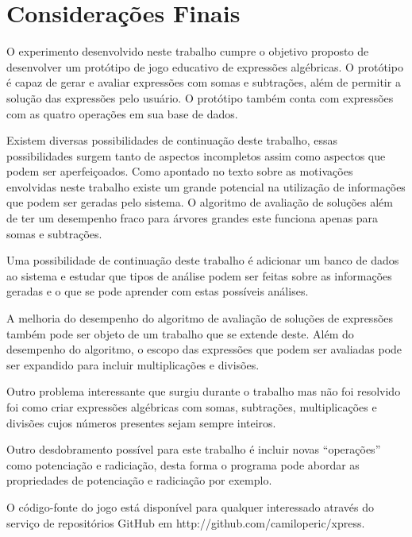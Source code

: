 \part{Considerações Finais}
O experimento desenvolvido neste trabalho cumpre o objetivo proposto de desenvolver um protótipo de jogo educativo de expressões algébricas. O protótipo é capaz de gerar e avaliar expressões com somas e subtrações, além de permitir a solução das expressões pelo usuário. O protótipo também conta com expressões com as quatro operações em sua base de dados.

Existem diversas possibilidades de continuação deste trabalho, essas possibilidades surgem tanto de aspectos incompletos assim como aspectos que podem ser aperfeiçoados. Como apontado no texto sobre as motivações envolvidas neste trabalho existe um grande potencial na utilização de informações que podem ser geradas pelo sistema. O algoritmo de avaliação de soluções além de ter um desempenho fraco para árvores grandes este funciona apenas para somas e subtrações.

Uma possibilidade de continuação deste trabalho é adicionar um banco de dados ao sistema e estudar que tipos de análise podem ser feitas sobre as informações geradas e o que se pode aprender com estas possíveis análises.

A melhoria do desempenho do algoritmo de avaliação de soluções de expressões também pode ser objeto de um trabalho que se extende deste. Além do desempenho do algoritmo, o escopo das expressões que podem ser avaliadas pode ser expandido para incluir multiplicações e divisões.

Outro problema interessante que surgiu durante o trabalho mas não foi resolvido foi como criar expressões algébricas com somas, subtrações, multiplicações e divisões cujos números presentes sejam sempre inteiros.

Outro desdobramento possível para este trabalho é incluir novas “operações” como potenciação e radiciação, desta forma o programa pode abordar as propriedades de potenciação e radiciação por exemplo.

O código-fonte do jogo está disponível para qualquer interessado através do serviço de repositórios GitHub em http://github.com/camiloperic/xpress.
